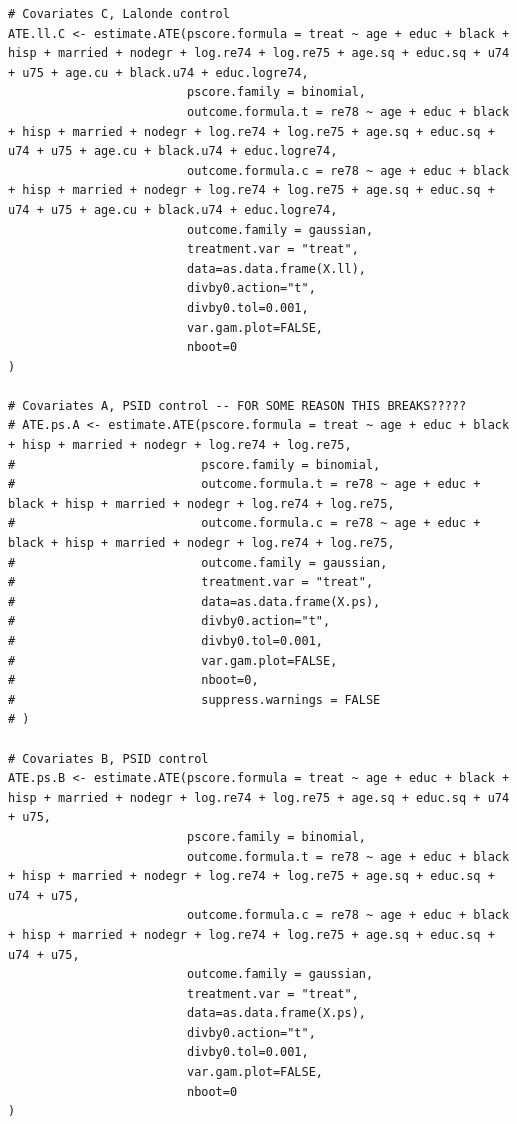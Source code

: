 \documentclass[12pt]{article}
\begin{document}
\begin{verbatim}
# Covariates C, Lalonde control
ATE.ll.C <- estimate.ATE(pscore.formula = treat ~ age + educ + black + hisp + married + nodegr + log.re74 + log.re75 + age.sq + educ.sq + u74 + u75 + age.cu + black.u74 + educ.logre74,
                         pscore.family = binomial,
                         outcome.formula.t = re78 ~ age + educ + black + hisp + married + nodegr + log.re74 + log.re75 + age.sq + educ.sq + u74 + u75 + age.cu + black.u74 + educ.logre74,
                         outcome.formula.c = re78 ~ age + educ + black + hisp + married + nodegr + log.re74 + log.re75 + age.sq + educ.sq + u74 + u75 + age.cu + black.u74 + educ.logre74,
                         outcome.family = gaussian,
                         treatment.var = "treat",
                         data=as.data.frame(X.ll),
                         divby0.action="t",
                         divby0.tol=0.001,
                         var.gam.plot=FALSE,
                         nboot=0
)

# Covariates A, PSID control -- FOR SOME REASON THIS BREAKS?????
# ATE.ps.A <- estimate.ATE(pscore.formula = treat ~ age + educ + black + hisp + married + nodegr + log.re74 + log.re75,
#                          pscore.family = binomial,
#                          outcome.formula.t = re78 ~ age + educ + black + hisp + married + nodegr + log.re74 + log.re75,
#                          outcome.formula.c = re78 ~ age + educ + black + hisp + married + nodegr + log.re74 + log.re75,
#                          outcome.family = gaussian,
#                          treatment.var = "treat",
#                          data=as.data.frame(X.ps),
#                          divby0.action="t",
#                          divby0.tol=0.001,
#                          var.gam.plot=FALSE,
#                          nboot=0,
#                          suppress.warnings = FALSE
# )

# Covariates B, PSID control
ATE.ps.B <- estimate.ATE(pscore.formula = treat ~ age + educ + black + hisp + married + nodegr + log.re74 + log.re75 + age.sq + educ.sq + u74 + u75,
                         pscore.family = binomial,
                         outcome.formula.t = re78 ~ age + educ + black + hisp + married + nodegr + log.re74 + log.re75 + age.sq + educ.sq + u74 + u75,
                         outcome.formula.c = re78 ~ age + educ + black + hisp + married + nodegr + log.re74 + log.re75 + age.sq + educ.sq + u74 + u75,
                         outcome.family = gaussian,
                         treatment.var = "treat",
                         data=as.data.frame(X.ps),
                         divby0.action="t",
                         divby0.tol=0.001,
                         var.gam.plot=FALSE,
                         nboot=0
) 


\end{verbatim}
\end{document}
